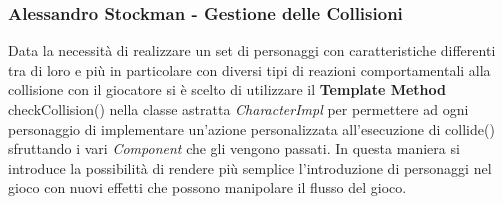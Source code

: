 \documentclass[a4paper,12pt, hidelinks]{report}
\begin{document}

\begin{flushright}
\item\subsubsection{Alessandro Stockman - Gestione delle Collisioni}
\end{flushright}

Data la necessità di realizzare un set di personaggi con caratteristiche differenti tra di loro e più in particolare con diversi tipi di reazioni comportamentali alla collisione con il giocatore si è scelto di utilizzare il \textbf{Template Method} checkCollision() nella classe astratta \emph{CharacterImpl} per permettere ad ogni personaggio di implementare un'azione personalizzata all'esecuzione di collide() sfruttando i vari \emph{Component} che gli vengono passati.
In questa maniera si introduce la possibilità di rendere più semplice l'introduzione di personaggi nel gioco con nuovi effetti che possono manipolare il flusso del gioco.
\end{document}

